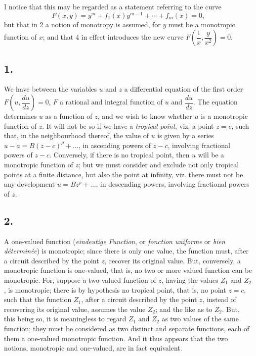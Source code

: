 \documentclass[11pt,a4paper]{book}
\begin{document}
I notice that this may be regarded as a statement referring to the curve
\[
F(x, y) = y^m + f_1(x)y^{m-1} + \cdots + f_m(x) = 0,
\]
but that in 2 a notion of monotropy is assumed, for $y$ must be a monotropic function of $x$; and that 4 in effect introduces the new curve $F\!\left(\dfrac{1}{x}, \dfrac{y}{x^2}\right) = 0$.

\subsection*{1.}

We have between the variables $u$ and $z$ a differential equation of the first order $F\!\left(u, \dfrac{du}{dz}\right) = 0$, $F$ a rational and integral function of $u$ and $\dfrac{du}{dz}$. The equation determines $u$ as a function of $z$, and we wish to know whether $u$ is a monotropic function of $z$. It will not be so if we have a \textit{tropical point}, viz. a point $z = c$, such that, in the neighbourhood thereof, the value of $u$ is given by a series $u - a = B(z - c)^\rho + \ldots$, in ascending powers of $z - c$, involving fractional powers of $z - c$. Conversely, if there is no tropical point, then $u$ will be a monotropic function of $z$; but we must consider and exclude not only tropical points at a finite distance, but also the point at infinity, viz. there must not be any development $u = Bz^\rho + \ldots$, in descending powers, involving fractional powers of $z$.

\subsection*{2.}

A one-valued function (\textit{eindeutige Function}, or \textit{fonction uniforme} or \textit{bien d\'etermin\'ee}) is monotropic; since there is only one value, the function must, after a circuit described by the point $z$, recover its original value. But, conversely, a monotropic function is one-valued, that is, no two or more valued function can be monotropic. For, suppose a two-valued function of $z$, having the values $Z_1$ and $Z_2$, is monotropic; there is by hypothesis no tropical point, that is, no point $z = c$, such that the function $Z_1$, after a circuit described by the point $z$, instead of recovering its original value, assumes the value $Z_2$; and the like as to $Z_2$. But, this being so, it is meaningless to regard $Z_1$ and $Z_2$ as two values of the same function; they must be considered as two distinct and separate functions, each of them a one-valued monotropic function. And it thus appears that the two notions, monotropic and one-valued, are in fact equivalent.
\end{document}
